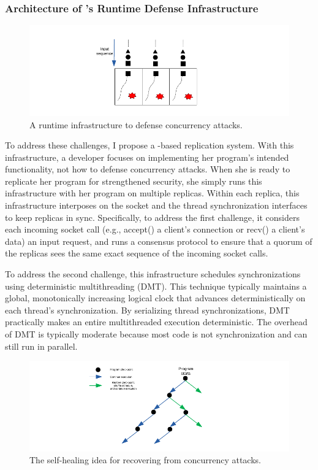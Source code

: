 \vspace{-.15in}\subsubsection{Architecture of \xxx's Runtime Defense 
Infrastructure} 
\label{sec:defense-arch}\vspace{-.075in}

\begin{figure}[ht]
\centering
\includegraphics[width=0.3\columnwidth]{figures/defense}
\vspace{-.05in}
\caption{{A runtime infrastructure to defense concurrency attacks.}} 
\label{fig:defense}
\vspace{-.05in}
\end{figure}

To address these challenges, I propose a \smr-based replication 
system. With this infrastructure, a developer focuses on implementing her 
program's intended functionality, not how to defense concurrency attacks. When 
she is ready to replicate her program for strengthened security, she simply
runs this infrastructure with her program on multiple replicas. Within
each replica, this infrastructure interposes on the socket and the thread
synchronization interfaces to keep replicas in sync. Specifically, to address 
the first challenge, it considers each incoming socket call (e.g., accept() a 
client's connection or recv() a client's data) an input request, and runs a 
\paxos consensus protocol to ensure that a quorum of the replicas sees the same 
exact sequence of the incoming socket calls.

To address the second challenge, this infrastructure schedules synchronizations 
using deterministic multithreading (DMT). This technique
typically maintains a global, monotonically increasing logical clock that 
advances deterministically on each thread's synchronization. By serializing 
thread synchronizations, DMT practically makes an entire multithreaded 
execution deterministic. The overhead
of DMT is typically moderate because most code is not synchronization and can 
still run in parallel.

\begin{figure}[ht]
\centering
\includegraphics[width=0.3\columnwidth]{figures/healing}
\vspace{-.05in}
\caption{{The self-healing idea for recovering from concurrency attacks.}} 
\label{fig:healing}
\vspace{-.05in}
\end{figure}

